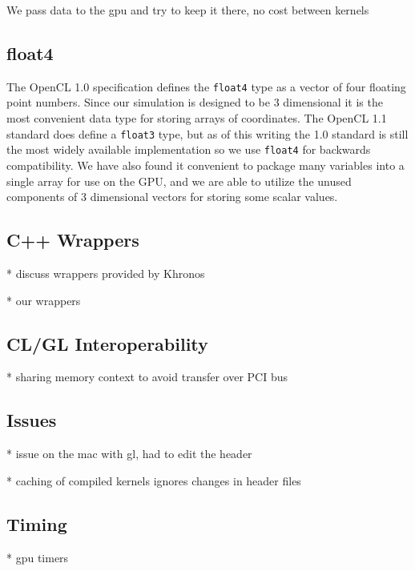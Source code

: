 We pass data to the gpu and try to keep it there, no cost between kernels


\subsection{float4}
The OpenCL 1.0 specification defines the \verb|float4| type as a vector of four
floating point numbers. Since our simulation is designed to be 3 dimensional it
is the most convenient data type for storing arrays of coordinates. The OpenCL
1.1 standard does define a \verb|float3| type, but as of this writing the 1.0
standard is still the most widely available implementation so we use \verb|float4|
for backwards compatibility. We have also found it convenient to package many
variables into a single array for use on the GPU, and we are able to utilize
the unused components of 3 dimensional vectors for storing some scalar values.

\subsection{C++ Wrappers}
* discuss wrappers provided by Khronos


* our wrappers


\subsection{CL/GL Interoperability}
* sharing memory context to avoid transfer over PCI bus


\subsection{Issues}

* issue on the mac with gl, had to edit the header


* caching of compiled kernels ignores changes in header files


\subsection{Timing}
* gpu timers


